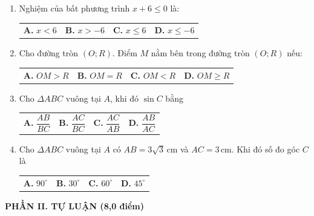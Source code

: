 \documentclass[12pt,a4paper]{article}
\begin{document}
\begin{enumerate}[label=\textbf{Câu \arabic*.}, leftmargin=*, itemsep=4.5pt, parsep=0pt]
  \item Nghiệm của bất phương trình $x + 6 \le 0$ là:
  \begin{flushleft}
    \begin{tabularx}{\linewidth}{X X X X}
      \textbf{A.} $x < 6$ & 
      \textbf{B.} $x > -6$ & 
      \textbf{C.} $x \le 6$ & 
      \textbf{D.} $x \le -6$
    \end{tabularx}
  \end{flushleft}

  \item Cho đường tròn $(O; R)$. Điểm $M$ nằm bên trong đường tròn $(O; R)$ nếu:
  \begin{flushleft}
    \begin{tabularx}{\linewidth}{X X X X}
      \textbf{A.} $OM > R$ & 
      \textbf{B.} $OM = R$ & 
      \textbf{C.} $OM < R$ & 
      \textbf{D.} $OM \ge R$
    \end{tabularx}
  \end{flushleft}

  \item Cho $\Delta ABC$ vuông tại $A$, khi đó $\sin C$ bằng
  \begin{flushleft}
    \begin{tabularx}{\linewidth}{X X X X}
      \textbf{A.} $\dfrac{AB}{BC}$ & 
      \textbf{B.} $\dfrac{AC}{BC}$ & 
      \textbf{C.} $\dfrac{AC}{AB}$ & 
      \textbf{D.} $\dfrac{AB}{AC}$
    \end{tabularx}
  \end{flushleft}

  \item Cho $\Delta ABC$ vuông tại $A$ có $AB = 3\sqrt{3}\,\text{cm}$ và $AC = 3\,\text{cm}$. Khi đó số đo góc $C$ là
  \begin{flushleft}
    \begin{tabularx}{\linewidth}{X X X X}
      \textbf{A.} $90^\circ$ & 
      \textbf{B.} $30^\circ$ & 
      \textbf{C.} $60^\circ$ & 
      \textbf{D.} $45^\circ$
    \end{tabularx}
  \end{flushleft}
\end{enumerate}

\newpage

\noindent\textbf{\large PHẦN II. TỰ LUẬN (8,0 điểm)}
\end{document}

